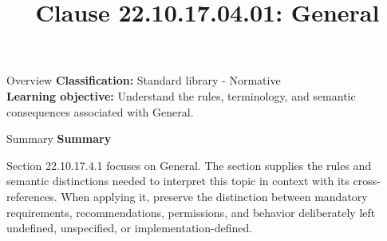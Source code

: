 \documentclass[10pt,letterpaper]{article}
\title{Clause 22.10.17.04.01: General}
\author{}
\date{}
\begin{document}
\maketitle
\begin{CornellOverviewBox}{Overview}
\textbf{Classification:} Standard library - Normative\\[2pt]
\textbf{Learning objective:} Understand the rules, terminology, and semantic consequences associated with General.
\end{CornellOverviewBox}\begin{CornellSummaryBox}{Summary}
{\sffamily\bfseries\color{Accent} Summary}\par\vspace{3pt}Section 22.10.17.4.1 focuses on General. The section supplies the rules and semantic distinctions needed to interpret this topic in context with its cross-references. When applying it, preserve the distinction between mandatory requirements, recommendations, permissions, and behavior deliberately left undefined, unspecified, or implementation-defined.
\end{CornellSummaryBox}
\end{document}
